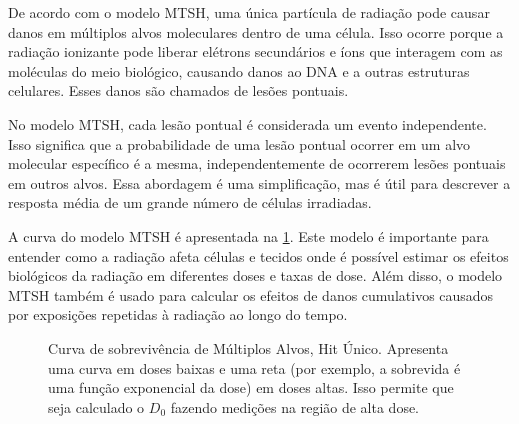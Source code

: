 \documentclass[11pt,a4paper]{article}
\newcounter{exemplo}
\begin{document}
	De acordo com o modelo MTSH, uma única partícula de radiação pode causar danos em múltiplos alvos moleculares dentro de uma célula. Isso ocorre porque a radiação ionizante pode liberar elétrons secundários e íons que interagem com as moléculas do meio biológico, causando danos ao DNA e a outras estruturas celulares. Esses danos são chamados de lesões pontuais.  

	No modelo MTSH, cada lesão pontual é considerada um evento independente. Isso significa que a probabilidade de uma lesão pontual ocorrer em um alvo molecular específico é a mesma, independentemente de ocorrerem lesões pontuais em outros alvos. Essa abordagem é uma simplificação, mas é útil para descrever a resposta média de um grande número de células irradiadas.

	A curva do modelo MTSH é apresentada na \ref{fig:singleHitMultiTarget}. Este modelo é importante para entender como a radiação afeta células e tecidos onde é possível estimar os efeitos biológicos da radiação em diferentes doses e taxas de dose. Além disso, o modelo MTSH também é usado para calcular os efeitos de danos cumulativos causados por exposições repetidas à radiação ao longo do tempo.

	\begin{figure}[h]
		\centering
		\caption{Curva de sobrevivência de Múltiplos Alvos, Hit Único. Apresenta uma curva em doses baixas e uma reta (por exemplo, a sobrevida é uma função exponencial da dose) em doses altas. Isso permite que seja calculado o $D_0$ fazendo medições na região de alta dose.}
		\label{fig:singleHitMultiTarget}
	\end{figure}
\end{document}
